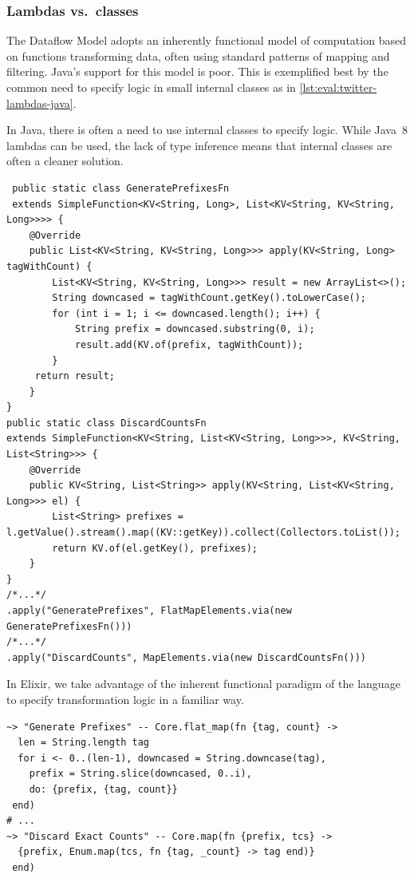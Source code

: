 \subsubsection{Lambdas vs.\ classes}

The Dataflow Model adopts an inherently functional model of computation based on functions transforming data, often using standard patterns of mapping and filtering.
Java's support for this model is poor.
This is exemplified best by the common need to specify logic in small internal classes as in \cref{lst:eval:twitter-lambdas-java}.

\begin{codelisting}
	\caption[Using internal classes to specify transformation logic in Java.]{In Java, there is often a need to use internal classes to specify logic. While Java~8 lambdas can be used, the lack of  type inference means that internal classes are often a cleaner solution.}
	\label{lst:eval:twitter-lambdas-java}
	\begin{verbatim}
 public static class GeneratePrefixesFn
 extends SimpleFunction<KV<String, Long>, List<KV<String, KV<String, Long>>>> {
    @Override
    public List<KV<String, KV<String, Long>>> apply(KV<String, Long> tagWithCount) {
        List<KV<String, KV<String, Long>>> result = new ArrayList<>();
        String downcased = tagWithCount.getKey().toLowerCase();
        for (int i = 1; i <= downcased.length(); i++) {
            String prefix = downcased.substring(0, i);
            result.add(KV.of(prefix, tagWithCount));
        }
     return result;
    }
}
public static class DiscardCountsFn
extends SimpleFunction<KV<String, List<KV<String, Long>>>, KV<String, List<String>>> {
    @Override
    public KV<String, List<String>> apply(KV<String, List<KV<String, Long>>> el) {
        List<String> prefixes = l.getValue().stream().map((KV::getKey)).collect(Collectors.toList());
        return KV.of(el.getKey(), prefixes);
    }
}
/*...*/
.apply("GeneratePrefixes", FlatMapElements.via(new GeneratePrefixesFn()))
/*...*/
.apply("DiscardCounts", MapElements.via(new DiscardCountsFn()))
	\end{verbatim}
\end{codelisting}

\begin{codelisting}
	\caption[Using lambdas to specify transformation logic in Elixir.]{In Elixir, we take advantage of the inherent functional paradigm of the language to specify transformation logic in a familiar way.}
	\label{lst:eval:twitter-lambdas-elixir}
	\begin{verbatim}
~> "Generate Prefixes" -- Core.flat_map(fn {tag, count} ->
  len = String.length tag
  for i <- 0..(len-1), downcased = String.downcase(tag),
    prefix = String.slice(downcased, 0..i),
    do: {prefix, {tag, count}}
 end)
# ...
~> "Discard Exact Counts" -- Core.map(fn {prefix, tcs} ->
  {prefix, Enum.map(tcs, fn {tag, _count} -> tag end)}
 end)
	\end{verbatim}
\end{codelisting}

